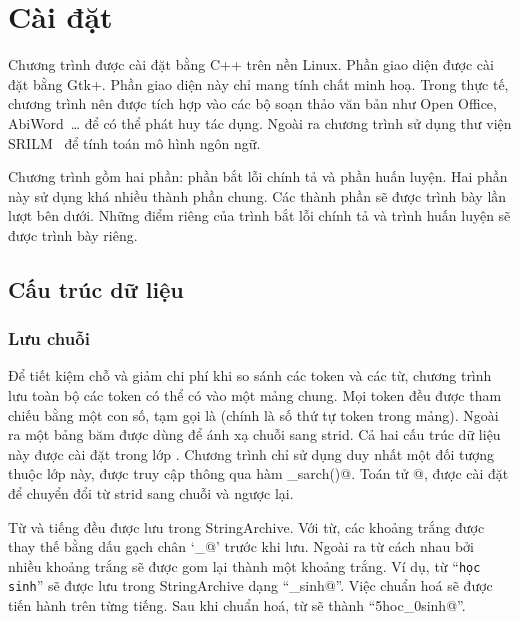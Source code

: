 \documentclass[a4paper,oneside,14pt]{extbook} %
\newcommand{\note}[1]{\underline{#1}}
\begin{document}




\chapter{Cài đặt}
\label{cha:implementation}
\minitoc
{}

Chương trình được cài đặt bằng C++ trên nền Linux. Phần giao diện được
cài đặt bằng Gtk+. Phần giao diện này chỉ mang tính chất minh
hoạ. Trong thực tế, chương trình nên được tích hợp vào các bộ soạn
thảo văn bản như Open Office, AbiWord~\ldots{} để có thể phát huy tác
dụng. Ngoài ra chương trình sử dụng thư viện SRILM~\cite{XXX} để tính toán mô
hình ngôn ngữ.

Chương trình gồm hai phần: phần bắt lỗi chính tả và phần huấn
luyện. Hai phần này sử dụng khá nhiều thành phần chung. Các
thành phần sẽ được trình bày lần lượt bên dưới. Những điểm riêng của
trình bắt lỗi chính tả và trình huấn luyện sẽ được trình bày riêng.


\section{Cấu trúc dữ liệu}
\label{sec:data-structure}

\subsection{Lưu chuỗi}
Để tiết kiệm chỗ và giảm chi phí khi so sánh các token và các từ, chương trình
lưu toàn bộ các token có thể có vào một mảng chung. Mọi token đều được
tham chiếu bằng một con số, tạm gọi là \verb@strid@ (chính là số thứ tự
token trong mảng). Ngoài ra một bảng băm được dùng để ánh xạ chuỗi
sang strid. Cả hai cấu trúc dữ liệu này được cài đặt trong lớp
\verb@StringArchive@. Chương trình chỉ sử dụng duy nhất một đối tượng 
thuộc lớp này, được truy cập thông qua hàm \verb@get_sarch()@. Toán tử
\verb@[]@, được cài đặt để chuyển đổi từ strid sang chuỗi và ngược lại.

Từ và tiếng đều được lưu trong StringArchive. Với từ, các khoảng trắng
được thay thế bằng dấu gạch chân `\verb@_@' trước khi lưu. Ngoài ra từ
cách nhau bởi nhiều khoảng trắng sẽ được gom lại thành một khoảng
trắng. Ví dụ, từ ``\texttt{học   sinh}'' sẽ được lưu trong StringArchive
dạng ``_sinh@''. Việc chuẩn hoá sẽ được tiến hành trên từng
tiếng. Sau khi chuẩn hoá, từ sẽ thành ``\verb@5hoc_0sinh@''.
\end{document}
